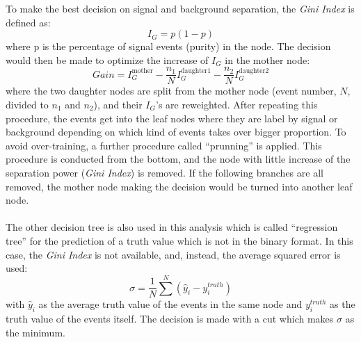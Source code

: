 To make the best decision on signal and background separation, the \textit{Gini Index} is defined as:
\begin{equation}
I_{G}= p(1-p)
\end{equation}
where p is the percentage of signal events (purity) in the node. The decision would then be made to optimize the increase of $I_{G}$ in the mother node:
\begin{equation}
Gain = I_{G}^{\text{mother}}-\frac{n_{1}}{N}I_{G}^{\text{daughter1}}-\frac{n_{2}}{N}I_{G}^{\text{daughter2}}
\end{equation} 
where the two daughter nodes are split from the mother node (event number, $N$, divided to $n_{1}$ and $n_{2}$), and their $I_{G}$'s are reweighted. After repeating this procedure, the events get into the leaf nodes where they are label by signal or background depending on which kind of events takes over bigger proportion. To avoid over-training, a further procedure called ``prunning'' is applied. This procedure is conducted from the bottom, and the node with little increase of the separation power (\textit{Gini Index}) is removed. If the following branches are all removed, the mother node making the decision would be turned into another leaf node. 
\\
\\The other decision tree is also used in this analysis which is called ``regression tree'' for the prediction of a truth value which is not in the binary format. In this case, the \textit{Gini Index} is not available, and, instead, the average squared error is used:
\begin{equation}
\sigma = \frac{1}{N}\sum^{N}(\hat{y}_i-y^{truth}_i)
\end{equation}
with $\hat{y}_i$ as the average truth value of the events in the same node and $y^{truth}_i$ as the truth value of the events itself. The decision is made with a cut which makes $\sigma$ as the minimum.
  
